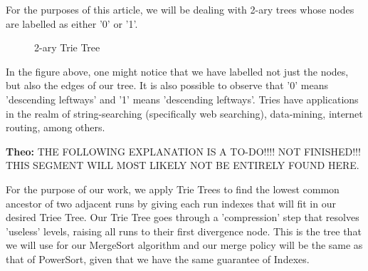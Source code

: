 \documentclass[a4paper]{article}
\theoremstyle{plain}
\theoremstyle{definition}
\begin{document}
For the purposes of this article, we will be dealing with 2-ary trees whose nodes are labelled as either
'0' or '1'. 
\begin{figure}[h]
\begin{center}
\caption{2-ary Trie Tree}
\end{center}
\end{figure}

In the figure above, one might notice that we have labelled not just the nodes, but
also the edges of our tree. It is also possible to observe that '0' means 'descending leftways'
and '1' means 'descending leftways'. Tries have applications in the realm of string-searching (specifically web searching),
data-mining, internet routing, among others. 

\textbf{Theo:} THE FOLLOWING EXPLANATION IS A TO-DO!!!! NOT FINISHED!!! THIS SEGMENT WILL MOST LIKELY NOT BE ENTIRELY FOUND HERE.

For the purpose of our work, we apply Trie Trees to find the lowest common ancestor
of two adjacent runs by giving each run indexes that will fit in our desired Triee Tree. 
Our Trie Tree goes through a 'compression' step that resolves 'useless' levels, raising all
runs to their first divergence node. This is the tree that we will use for our MergeSort algorithm
and our merge policy will be the same as that of PowerSort, given that we have the same guarantee of
Indexes. 
\end{document}

